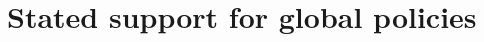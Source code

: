 \documentclass{nature}
\begin{document}





\section{Stated support for global policies}\label{subsec:stated_support}


\end{document}
